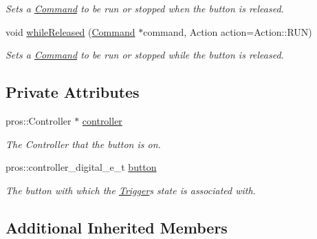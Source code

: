 \begin{DoxyCompactItemize}
\begin{DoxyCompactList}\small\item\em Sets a \mbox{\hyperlink{classlib_iterative_robot_1_1_command}{Command}} to be run or stopped when the button is released. \end{DoxyCompactList}\item 
void \mbox{\hyperlink{classlib_iterative_robot_1_1_joystick_button_a6d781e460c7ee3325de48e7a5ade9ebd}{while\+Released}} (\mbox{\hyperlink{classlib_iterative_robot_1_1_command}{Command}} $\ast$command, Action action=Action\+::\+R\+UN)
\begin{DoxyCompactList}\small\item\em Sets a \mbox{\hyperlink{classlib_iterative_robot_1_1_command}{Command}} to be run or stopped while the button is released. \end{DoxyCompactList}\end{DoxyCompactItemize}
\subsection*{Private Attributes}
\begin{DoxyCompactItemize}
\item 
\mbox{\label{classlib_iterative_robot_1_1_joystick_button_a092e3793ba078aff20f17b812345fbda}} 
pros\+::\+Controller $\ast$ \mbox{\hyperlink{classlib_iterative_robot_1_1_joystick_button_a092e3793ba078aff20f17b812345fbda}{controller}}
\begin{DoxyCompactList}\small\item\em The Controller that the button is on. \end{DoxyCompactList}\item 
\mbox{\label{classlib_iterative_robot_1_1_joystick_button_a505db434cba7b3ba8e57da5b09ab5efe}} 
pros\+::controller\+\_\+digital\+\_\+e\+\_\+t \mbox{\hyperlink{classlib_iterative_robot_1_1_joystick_button_a505db434cba7b3ba8e57da5b09ab5efe}{button}}
\begin{DoxyCompactList}\small\item\em The button with which the \mbox{\hyperlink{classlib_iterative_robot_1_1_trigger}{Trigger}}\textquotesingle{}s state is associated with. \end{DoxyCompactList}\end{DoxyCompactItemize}
\subsection*{Additional Inherited Members}


